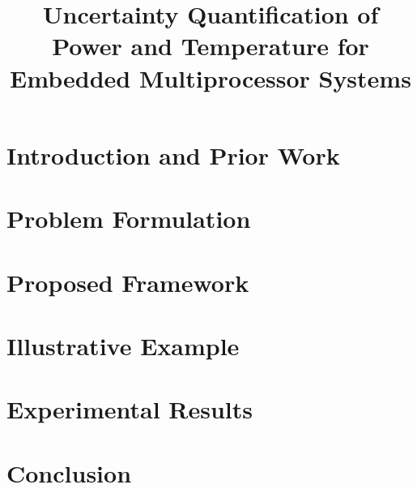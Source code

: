 \documentclass{sig-alternate}
\begin{document}
  \title{Uncertainty Quantification of Power and Temperature for Embedded Multiprocessor Systems}

  \maketitle

  \begin{abstract}
    
  \end{abstract}

  \section{Introduction and Prior Work} 
  

  \vspace{-0.5em}
  \section{Problem Formulation}    
  

  \vspace{-0.5em}
  \section{Proposed Framework} 
  

  \vspace{-0.5em}
  \section{Illustrative Example} 
  

  \vspace{-0.5em}
  \section{Experimental Results} 
  

  \vspace{-0.5em}
  \section{Conclusion} 
  

  \vspace{-1.2em}
  \begingroup
  \setlength\bibitemsep{1pt}
  \printbibliography
  \endgroup

  \appendix
  
\end{document}
